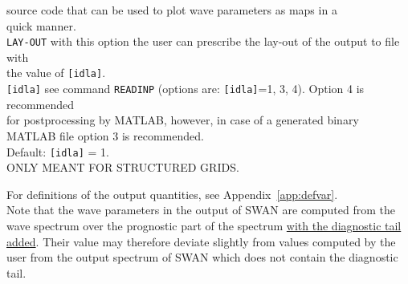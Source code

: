 \documentclass[12pt]{book}
\begin{document}
\begin{tabbing}
                   source code that can be used to plot wave parameters as maps in a\\
                   quick manner.\-\\
{\tt LAY-OUT}   \> with this option the user can prescribe the lay-out of the output to file with\+\\
                   the value of {\tt [idla]}.\-\\
{\tt [idla]}    \> see command {\tt READINP} (options are: {\tt [idla]}=1, 3, 4). Option 4 is recommended\+\\
                   for postprocessing by MATLAB, however, in case of a generated binary\\
                   MATLAB file option 3 is recommended.\\
                   Default: {\tt [idla]} = 1.\\
                   ONLY MEANT FOR STRUCTURED GRIDS.\-\\
\end{tabbing}

\noindent
For definitions of the output quantities, see Appendix~\ref{app:defvar}.
\\[2ex]
Note that the wave parameters in the output of SWAN are computed from the wave spectrum over the prognostic part of the spectrum
\underline{with the diagnostic tail added}. Their value may therefore deviate slightly from values computed by the user from the
output spectrum of SWAN which does not contain the diagnostic tail.
\end{document}

